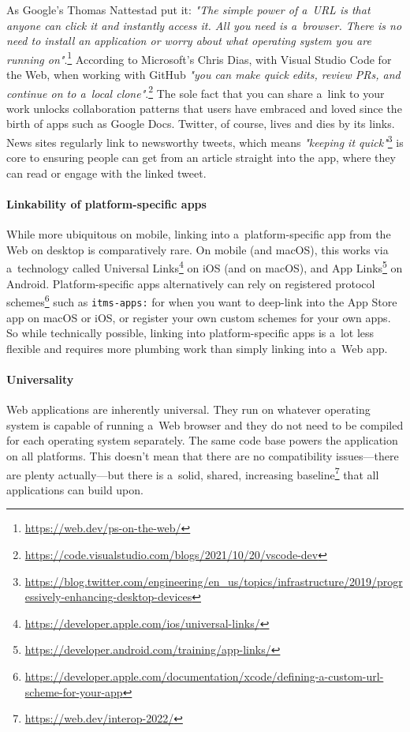 \documentclass[sigconf]{acmart}
\begin{document}
As Google's Thomas Nattestad put it: \textit{"The simple power of a~URL is that anyone can click it and instantly access it. All you need is a~browser. There is no need to install an application or worry about what operating system you are running on"}.\footnote{\url{https://web.dev/ps-on-the-web/}} According to Microsoft's Chris Dias, with Visual Studio Code for the Web, when working with GitHub \textit{"you can make quick edits, review PRs, and continue on to a~local clone"}.\footnote{\url{https://code.visualstudio.com/blogs/2021/10/20/vscode-dev}} The sole fact that you can share a~link to your work unlocks collaboration patterns that users have embraced and loved since the birth of apps such as Google Docs. Twitter, of course, lives and dies by its links. News sites regularly link to newsworthy tweets, which means \textit{"keeping it quick"}\footnote{\url{https://blog.twitter.com/engineering/en_us/topics/infrastructure/2019/progressively-enhancing-desktop-devices}} is core to ensuring people can get from an article straight into the app, where they can read or engage with the linked tweet.

\paragraph{Linkability of platform-specific apps}

While more ubiquitous on mobile, linking into a~platform-specific app from the Web on desktop is comparatively rare. On mobile (and macOS), this works via a~technology called Universal Links\footnote{\url{https://developer.apple.com/ios/universal-links/}} on iOS (and on macOS), and App Links\footnote{\url{https://developer.android.com/training/app-links/}} on Android. Platform-specific apps alternatively can rely on registered protocol schemes\footnote{\url{https://developer.apple.com/documentation/xcode/defining-a-custom-url-scheme-for-your-app}} such as \texttt{itms-apps:} for when you want to deep-link into the App Store app on macOS or iOS, or register your own custom schemes for your own apps. So while technically possible, linking into platform-specific apps is a~lot less flexible and requires more plumbing work than simply linking into a~Web app.

\paragraph{Universality}

Web applications are inherently universal. They run on whatever operating system is capable of running a~Web browser and they do not need to be compiled for each operating system separately. The same code base powers the application on all platforms. This doesn't mean that there are no compatibility issues—there are plenty actually—but there is a~solid, shared, increasing baseline\footnote{\url{https://web.dev/interop-2022/}} that all applications can build upon.
\end{document}
